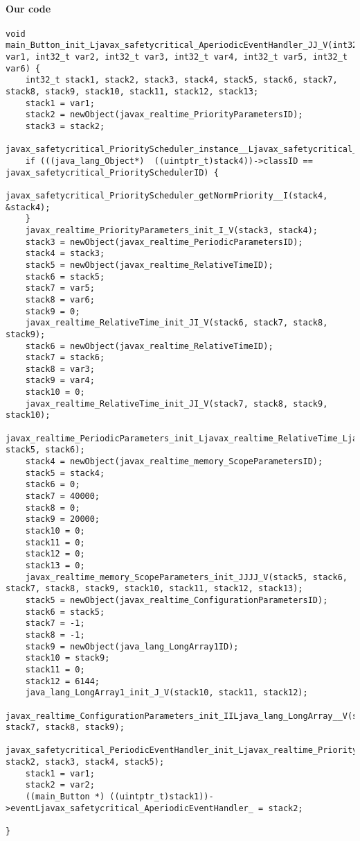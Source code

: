 \paragraph{Our code}\hfill
\begin{lstlisting}[firstnumber=2208]
void main_Button_init_Ljavax_safetycritical_AperiodicEventHandler_JJ_V(int32_t var1, int32_t var2, int32_t var3, int32_t var4, int32_t var5, int32_t var6) {
	int32_t stack1, stack2, stack3, stack4, stack5, stack6, stack7, stack8, stack9, stack10, stack11, stack12, stack13;
	stack1 = var1;
	stack2 = newObject(javax_realtime_PriorityParametersID);
	stack3 = stack2;
	javax_safetycritical_PriorityScheduler_instance__Ljavax_safetycritical_PriorityScheduler_(&stack4);
	if (((java_lang_Object*)  ((uintptr_t)stack4))->classID == javax_safetycritical_PrioritySchedulerID) {
		javax_safetycritical_PriorityScheduler_getNormPriority__I(stack4, &stack4);
	}
	javax_realtime_PriorityParameters_init_I_V(stack3, stack4);
	stack3 = newObject(javax_realtime_PeriodicParametersID);
	stack4 = stack3;
	stack5 = newObject(javax_realtime_RelativeTimeID);
	stack6 = stack5;
	stack7 = var5;
	stack8 = var6;
	stack9 = 0;
	javax_realtime_RelativeTime_init_JI_V(stack6, stack7, stack8, stack9);
	stack6 = newObject(javax_realtime_RelativeTimeID);
	stack7 = stack6;
	stack8 = var3;
	stack9 = var4;
	stack10 = 0;
	javax_realtime_RelativeTime_init_JI_V(stack7, stack8, stack9, stack10);
	javax_realtime_PeriodicParameters_init_Ljavax_realtime_RelativeTime_Ljavax_realtime_RelativeTime__V(stack4, stack5, stack6);
	stack4 = newObject(javax_realtime_memory_ScopeParametersID);
	stack5 = stack4;
	stack6 = 0;
	stack7 = 40000;
	stack8 = 0;
	stack9 = 20000;
	stack10 = 0;
	stack11 = 0;
	stack12 = 0;
	stack13 = 0;
	javax_realtime_memory_ScopeParameters_init_JJJJ_V(stack5, stack6, stack7, stack8, stack9, stack10, stack11, stack12, stack13);
	stack5 = newObject(javax_realtime_ConfigurationParametersID);
	stack6 = stack5;
	stack7 = -1;
	stack8 = -1;
	stack9 = newObject(java_lang_LongArray1ID);
	stack10 = stack9;
	stack11 = 0;
	stack12 = 6144;
	java_lang_LongArray1_init_J_V(stack10, stack11, stack12);
	javax_realtime_ConfigurationParameters_init_IILjava_lang_LongArray__V(stack6, stack7, stack8, stack9);
	javax_safetycritical_PeriodicEventHandler_init_Ljavax_realtime_PriorityParameters_Ljavax_realtime_PeriodicParameters_Ljavax_realtime_memory_ScopeParameters_Ljavax_realtime_ConfigurationParameters__V(stack1, stack2, stack3, stack4, stack5);
	stack1 = var1;
	stack2 = var2;
	((main_Button *) ((uintptr_t)stack1))->eventLjavax_safetycritical_AperiodicEventHandler_ = stack2;

}
\end{lstlisting}

